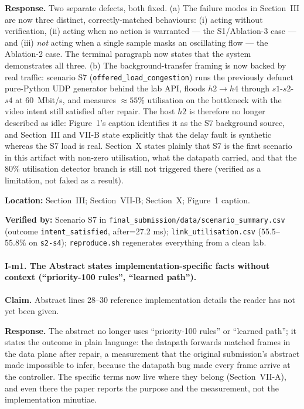 \documentclass[11pt,a4paper]{article}
\begin{document}
\textbf{Response.} Two separate defects, both fixed. (a) The failure modes in
Section~III are now three distinct, correctly-matched behaviours: (i) acting
without verification, (ii) acting when no action is warranted --- the S1/Ablation-3
case --- and (iii) \emph{not} acting when a single sample masks an oscillating flow
--- the Ablation-2 case. The terminal paragraph now states that the system
demonstrates all three. (b) The background-transfer framing is now backed by real
traffic: scenario S7 (\texttt{offered\_load\_congestion}) runs the previously
defunct pure-Python UDP generator behind the lab API, floods $h2\to h4$ through
$s1$-$s2$-$s4$ at $60$~Mbit/s, and measures $\approx 55\%$ utilisation on the
bottleneck with the video intent still satisfied after repair. The host $h2$ is
therefore no longer described as idle: Figure~1's caption identifies it as the S7
background source, and Section~III and VII-B state explicitly that the delay fault
is synthetic whereas the S7 load is real. Section~X states plainly that S7 is the
first scenario in this artifact with non-zero utilisation, what the datapath
carried, and that the $80\%$ utilisation detector branch is still not triggered
there (verified as a limitation, not faked as a result).

\textbf{Location:} Section~III; Section~VII-B; Section~X; Figure~1 caption.

\textbf{Verified by:} Scenario S7 in
\texttt{final\_submission/data/scenario\_summary.csv} (outcome
\texttt{intent\_satisfied}, after=27.2 ms);
\texttt{link\_utilisation.csv} ($55.5$--$55.8\%$ on \texttt{s2-s4});
\texttt{reproduce.sh} regenerates everything from a clean lab.

\paragraph{I-m1. The Abstract states implementation-specific facts without
context (``priority-100 rules'', ``learned path'').}

\textbf{Claim.} Abstract lines 28--30 reference implementation details the reader
has not yet been given.

\textbf{Response.} The abstract no longer uses ``priority-100 rules'' or
``learned path''; it states the outcome in plain language: the datapath forwards
matched frames in the data plane after repair, a measurement that the original
submission's abstract made impossible to infer, because the datapath bug made
every frame arrive at the controller. The specific terms now live where they
belong (Section~VII-A), and even there the paper reports the purpose and the
measurement, not the implementation minutiae.
\end{document}

